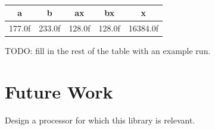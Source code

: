 \documentclass{acmsiggraph}
\theoremstyle{remark}
\theoremstyle{definition}
\begin{document}
{ \tt
\begin{tabular}{r|r|r|r|r}
\multicolumn{1}{c|}{a} &
\multicolumn{1}{c|}{b} &
\multicolumn{1}{c|}{ax} &
\multicolumn{1}{c|}{bx} &
\multicolumn{1}{c}{x} \\\hline
177.0f & 233.0f & 128.0f & 128.0f & 16384.0f \\
\end{tabular}
}

TODO: fill in the rest of the table with an example run.

\section{Future Work}

Design a processor for which this library is relevant.
\end{document}
